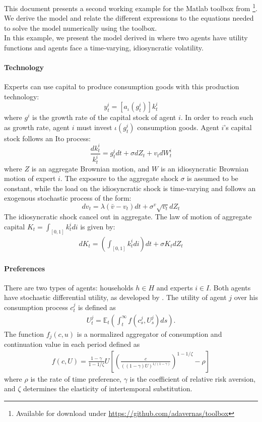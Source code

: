 \documentclass[12pt,english]{article}
\begin{document}
This document presents a second working example for the Matlab toolbox from \citet{asv20}\footnote{Available for download under \url{https://github.com/adavernas/toolbox} }. We derive the model and relate the different expressions to the equations needed to solve the model numerically using the toolbox. \\
In this example, we present the model derived in \citet{dit16} where two agents have \citet*{epst89} utility functions and agents face a time-varying, idiosyncratic volatility. 

\paragraph{Technology}
Experts can use capital to produce consumption goods with this production technology:
\begin{equation}
y_t^i = \left[a _ \iota(g_t^i)\right]k_t^i
\end{equation}
where $g^i$ is the growth rate of the capital stock of agent $i$. In order to reach such as growth rate, agent $i$ must invest $\iota(g_t^i)$ consumption goods. Agent $i$'s capital stock follows an Ito process:
\begin{equation}
\frac{dk_t^i}{k_t^i} = g_t^idt + \sigma dZ_t + v_tdW_t^i
\end{equation} 
where $Z$ is an aggregate Brownian motion, and $W$ is an idiosyncratic Brownian motion of expert $i$.  The exposure to the aggregate shock $\sigma$ is assumed to be constant, while the load on the idiosyncratic shock is time-varying and follows an exogenous stochastic process of the form:
\begin{equation}
dv_t = \lambda(\bar{v} - v_t)dt + \sigma^v\sqrt{v_t}dZ_t
\end{equation}
The idiosyncratic shock cancel out in aggregate. The law of motion of aggregate capital $K_t  = \int_{[0,1]}k_t^idi$ is given by:
\begin{align*}
	dK_t = \left(\int_{[0,1]}k_t^idi\right)dt + \sigma K_tdZ_t
\end{align*}
\paragraph{Preferences} There are two types of agents: households $h \in H$ and experts $i \in I$. Both agents have stochastic differential utility, as developed by \citet*{duff92}. The utility of agent $j$ over his consumption process $c^j_t$ is defined as
\begin{align*}
U^j_t = \mathbb{E}_t\left(\int_t^\infty f\left(c^j_s,U^j_s\right)ds \right).
\end{align*}
The function $f_j(c,u)$ is a normalized aggregator of consumption and continuation value in each period defined as
\begin{align*}
f(c,U) = \frac{1-\gamma}{1-1/\zeta}U\left[\left(\frac{c}{((1-\gamma)U)^{1/(1-\gamma)}}\right)^{1-1/\zeta}-\rho\right]
\end{align*}
where $\rho$ is the rate of time preference, $\gamma$ is the coefficient of relative risk aversion, and $\zeta$ determines the elasticity of intertemporal substitution. 
\end{document}
